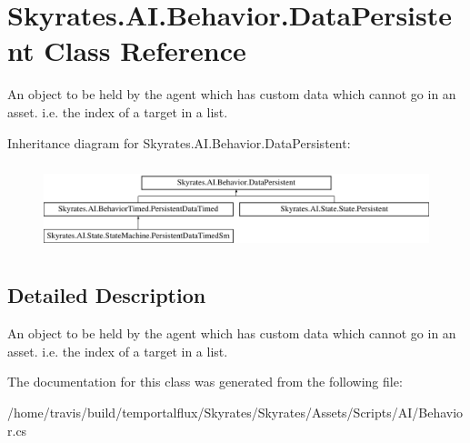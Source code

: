 \hypertarget{class_skyrates_1_1_a_i_1_1_behavior_1_1_data_persistent}{\section{Skyrates.\-A\-I.\-Behavior.\-Data\-Persistent Class Reference}
\label{class_skyrates_1_1_a_i_1_1_behavior_1_1_data_persistent}
}


An object to be held by the agent which has custom data which cannot go in an asset. i.\-e. the index of a target in a list.  


Inheritance diagram for Skyrates.\-A\-I.\-Behavior.\-Data\-Persistent\-:\begin{figure}[H]
\begin{center}
\leavevmode
\includegraphics[height=2.522523cm]{class_skyrates_1_1_a_i_1_1_behavior_1_1_data_persistent}
\end{center}
\end{figure}


\subsection{Detailed Description}
An object to be held by the agent which has custom data which cannot go in an asset. i.\-e. the index of a target in a list. 



The documentation for this class was generated from the following file\-:\begin{DoxyCompactItemize}
\item 
/home/travis/build/temportalflux/\-Skyrates/\-Skyrates/\-Assets/\-Scripts/\-A\-I/Behavior.\-cs\end{DoxyCompactItemize}

